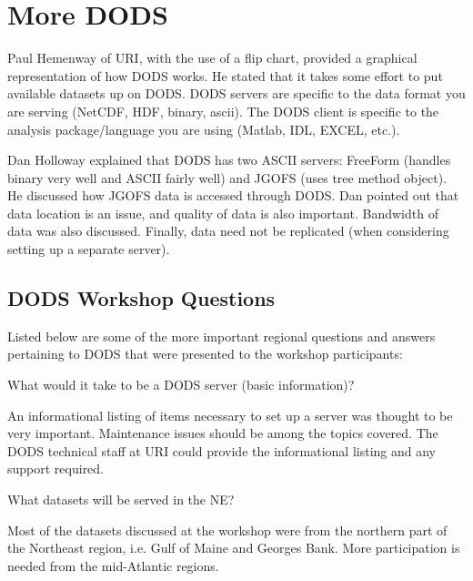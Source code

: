 \section{More DODS}

Paul Hemenway of URI, with the use of a flip chart, provided a
graphical representation of how DODS works.  He stated that it takes
some effort to put available datasets up on DODS.  DODS servers are
specific to the data format you are serving (NetCDF, HDF, binary,
ascii).  The DODS client is specific to the analysis package/language
you are using (Matlab, IDL, EXCEL, etc.).

Dan Holloway explained that DODS has two ASCII servers: FreeForm
(handles binary very well and ASCII fairly well) and JGOFS (uses tree
method object).  He discussed how JGOFS data is accessed through DODS.
Dan pointed out that data location is an issue, and quality of data is
also important.  Bandwidth of data was also discussed.  Finally, data
need not be replicated (when considering setting up a separate
server).


\subsection{DODS Workshop Questions}

Listed below are some of the more important regional questions and
answers pertaining to DODS that were presented to the workshop
participants:

What would it take to be a DODS server (basic information)?

An informational listing of items necessary to set up a server was
thought to be very important. Maintenance issues should be among the
topics covered. The DODS technical staff at URI could provide the
informational listing and any support required.

What datasets will be served in the NE?

Most of the datasets discussed at the workshop were from the northern
part of the Northeast region, i.e. Gulf of Maine and Georges Bank.
More participation is needed from the mid-Atlantic regions.

